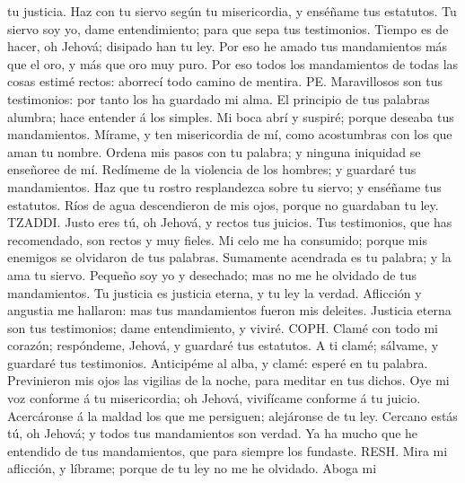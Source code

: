 tu justicia.  Haz con tu siervo según tu misericordia, y
enséñame tus estatutos.  Tu siervo soy yo, dame
entendimiento; para que sepa tus testimonios.  Tiempo es
de hacer, oh Jehová; disipado han tu ley.  Por eso he
amado tus mandamientos más que el oro, y más que oro muy puro.
 Por eso todos los mandamientos de todas las cosas
estimé rectos: aborrecí todo camino de mentira.  PE.
Maravillosos son tus testimonios: por tanto los ha guardado mi alma.
 El principio de tus palabras alumbra; hace entender á
los simples.  Mi boca abrí y suspiré; porque deseaba tus
mandamientos.  Mírame, y ten misericordia de mí, como
acostumbras con los que aman tu nombre.  Ordena mis
pasos con tu palabra; y ninguna iniquidad se enseñoree de mí.
 Redímeme de la violencia de los hombres; y guardaré tus
mandamientos.  Haz que tu rostro resplandezca sobre tu
siervo; y enséñame tus estatutos.  Ríos de agua
descendieron de mis ojos, porque no guardaban tu ley. 
TZADDI. Justo eres tú, oh Jehová, y rectos tus juicios. 
Tus testimonios, que has recomendado, son rectos y muy fieles.
 Mi celo me ha consumido; porque mis enemigos se
olvidaron de tus palabras.  Sumamente acendrada es tu
palabra; y la ama tu siervo.  Pequeño soy yo y
desechado; mas no me he olvidado de tus mandamientos. 
Tu justicia es justicia eterna, y tu ley la verdad. 
Aflicción y angustia me hallaron: mas tus mandamientos fueron mis
deleites.  Justicia eterna son tus testimonios; dame
entendimiento, y viviré.  COPH. Clamé con todo mi
corazón; respóndeme, Jehová, y guardaré tus estatutos. 
A ti clamé; sálvame, y guardaré tus testimonios. 
Anticipéme al alba, y clamé: esperé en tu palabra. 
Previnieron mis ojos las vigilias de la noche, para meditar en tus
dichos.  Oye mi voz conforme á tu misericordia; oh
Jehová, vivifícame conforme á tu juicio.  Acercáronse á
la maldad los que me persiguen; alejáronse de tu ley. 
Cercano estás tú, oh Jehová; y todos tus mandamientos son verdad.
 Ya ha mucho que he entendido de tus mandamientos, que
para siempre los fundaste.  RESH. Mira mi aflicción, y
líbrame; porque de tu ley no me he olvidado.  Aboga mi
